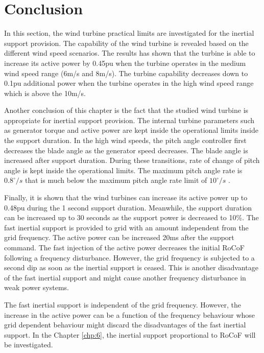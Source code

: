 \section{Conclusion}
In this section, the wind turbine practical limits are investigated for the inertial support provision. The capability of the wind turbine is revealed based on the different wind speed scenarios. The results has shown that the turbine is able to increase its active power by 0.45pu when the turbine operates in the medium wind speed range (6m/s and 8m/s). The turbine capability decreases down to 0.1pu additional power when the turbine operates in the high wind speed range which is above the 10m/s.\par
Another conclusion of this chapter is the fact that the studied wind turbine is appropriate for inertial support provision. The internal turbine parameters such as generator torque and active power are kept inside the operational limits inside the support duration. In the high wind speeds, the pitch angle controller first decreases the blade angle as the generator speed decreases. The blade angle is increased after support duration. During these transitions, rate of change of pitch angle is kept inside the operational limits. The maximum pitch angle rate is $0.8^{\circ}/s$ that is much below the maximum pitch angle rate limit of $10^{\circ}/s$ \cite{Ackermann2005a}.\par
Finally, it is shown that the wind turbines can increase its active power up to 0.48pu during the 1 second support duration. Meanwhile, the support duration can be increased up to 30 seconds as the support power is decreased to 10\%. The fast inertial support is provided to grid with an amount independent from the grid frequency. The active power can be increased 20ms after the support command. The fast injection of the active power decreases the initial RoCoF following a frequency disturbance. However, the grid frequency is subjected to a second dip as soon as the inertial support is ceased. This is another disadvantage of the fast inertial support and might cause another frequency disturbance in weak power systems. \par
The fast inertial support is independent of the grid frequency. However, the increase in the active power can be a function of the frequency behaviour whose grid dependent behaviour might discard the disadvantages of the fast inertial support. In the Chapter \ref{chp:6}, the inertial support proportional to RoCoF will be investigated. 